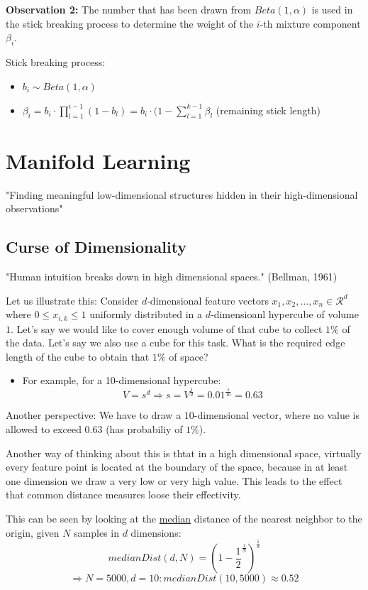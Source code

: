 \documentclass{scrartcl}
\begin{document}
\textbf{Observation 2:} The number that has been drawn from \(Beta(1,\alpha)\) is used in the stick breaking process to determine the weight of the \(i\)-th mixture component \(\beta_i\).

Stick breaking process:
\begin{itemize}
    \item
        \(b_i \sim Beta(1, \alpha)\)
    \item
        \(\beta_i = b_i \cdot \prod_{l=1}^{i-1} (1-b_l) = b_i \cdot (1-\sum_{l=1}^{k-1} \beta_l\) (remaining stick length)
\end{itemize}

\section{Manifold Learning}
"Finding meaningful low-dimensional structures hidden in their high-dimensional observations"
\subsection{Curse of Dimensionality}
"Human intuition breaks down in high dimensional spaces." (Bellman, 1961)

Let us illustrate this: Consider \(d\)-dimensional feature vectors \(x_1, x_2, \dots, x_n \in \mathcal{R}^d\) where \(0 \leq x_{i,k} \leq 1\) uniformly distributed in a \(d\)-dimensioanl hypercube of volume \(1\). Let's say we would like to cover enough volume of that cube to collect \(1\%\) of the data. Let's say we also use a cube for this task. What is the required edge length of the cube to obtain that \(1\%\) of space?
\begin{itemize}
    \item
        For example, for a 10-dimensional hypercube: 
        \[V = s^d \Rightarrow s = V^{\frac{1}{d}} = 0.01^{\frac{1}{10}} = 0.63\] 
\end{itemize}
Another perspective: We have to draw a \(10\)-dimensional vector, where no value is allowed to exceed \(0.63\) (has probabiliy of \(1\%\)).

Another way of thinking about this is thtat in a high dimensional space, virtually every feature point is located at the boundary of the space, because in at least one dimension we draw a very low or very high value. This leads to the effect that common distance measures loose their effectivity.

This can be seen by looking at the \underline{median} distance of the nearest neighbor to the origin, given \(N\) samples in \(d\) dimensions:
\[medianDist(d, N) = (1 - \frac{1}{2}^{\frac{1}{N}})^{\frac{1}{d}}\]
\[\Rightarrow N=5000, d=10: medianDist(10, 5000) \approx 0.52\]
\end{document}
